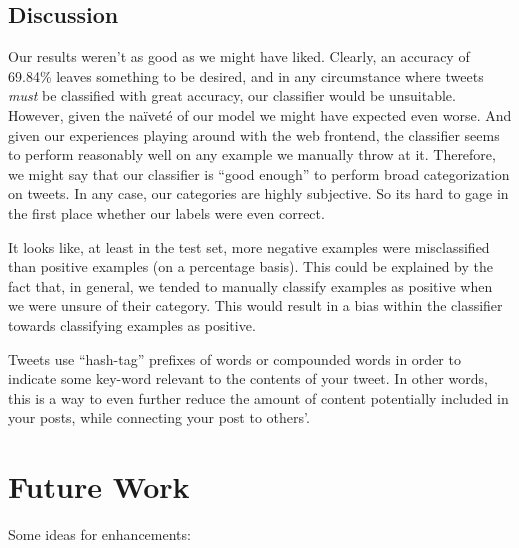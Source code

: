 \documentclass[12pt,a4paper]{article}
\begin{document}
\subsection{Discussion}

Our results weren't as good as we might have liked. Clearly, an accuracy of 69.84\% leaves something to be desired, and in any circumstance where tweets \emph{must} be classified with great accuracy, our classifier would be unsuitable. However, given the naïveté of our model we might have expected even worse. And given our experiences playing around with the web frontend, the classifier seems to perform reasonably well on any example we manually throw at it. Therefore, we might say that our classifier is ``good enough'' to perform broad categorization on tweets. In any case, our categories are highly subjective. So its hard to gage in the first place whether our labels were even correct.

It looks like, at least in the test set, more negative examples were misclassified than positive examples (on a percentage basis). This could be explained by the fact that, in general, we tended to manually classify examples as positive when we were unsure of their category. This would result in a bias within the classifier towards classifying examples as positive.

Tweets use ``hash-tag'' prefixes of words or compounded words in order to indicate some key-word relevant to the contents of your tweet.  In other words, this is a way to even further reduce the amount of content potentially included in your posts, while connecting your post to others'.

\section { Future Work}

Some ideas for enhancements:
\end{document}
